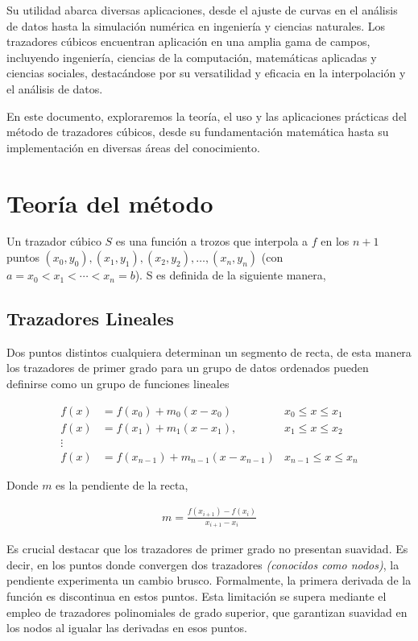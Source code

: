 \documentclass[conference]{IEEEtran}
\begin{document}
Su utilidad abarca diversas aplicaciones, desde el ajuste de curvas
en el análisis de datos hasta la simulación numérica en ingeniería y ciencias
naturales. Los trazadores cúbicos encuentran aplicación en una amplia gama de
campos, incluyendo ingeniería, ciencias de la computación, matemáticas
aplicadas y ciencias sociales, destacándose por su versatilidad y eficacia
en la interpolación y el análisis de datos.

En este documento, exploraremos la teoría, el uso y las aplicaciones
prácticas del método de trazadores cúbicos, desde su fundamentación
matemática hasta su implementación en diversas áreas del conocimiento.

\section{Teoría del método}

Un trazador cúbico $S$ es una función a trozos que interpola a $f$ en los
$n + 1$ puntos $(x_0, y_0), (x_1, y_1), (x_2, y_2), \dots, (x_n, y_n)$
(con $a = x_0 < x_1 < \cdots < x_n = b$). S es definida de la siguiente manera,

\subsection{Trazadores Lineales}

Dos puntos distintos cualquiera determinan un segmento de recta, de esta
manera los trazadores de primer grado para un grupo de datos ordenados
pueden definirse como un grupo de funciones lineales

\begin{align*}
	f(x)   & = f(x_{0}) + m_{0}(x - x_{0})             & x_{0} \leq x \leq x_{1}     \\
	f(x)   & = f(x_{1}) + m_{1}(x - x_{1}),            & x_{1} \leq x \leq x_{2}     \\
	\vdots &                                           &                             \\
	f(x)   & = f(x_{n - 1}) + m_{n - 1}(x - x_{n - 1}) & x_{n - 1} \leq x \leq x_{n}
\end{align*}

Donde $m$ es la pendiente de la recta,

\begin{align*}
	m = \frac{f(x_{i + 1}) - f(x_{i})}{x_{i + 1} - x_{i}}
\end{align*}

Es crucial destacar que los trazadores de primer grado no presentan
suavidad. Es decir, en los puntos donde convergen dos trazadores
\textit{(conocidos como nodos)}, la pendiente experimenta un cambio brusco.
Formalmente, la primera derivada de la función es discontinua en estos
puntos. Esta limitación se supera mediante el empleo de trazadores
polinomiales de grado superior, que garantizan suavidad en los nodos al
igualar las derivadas en esos puntos.
\end{document}
